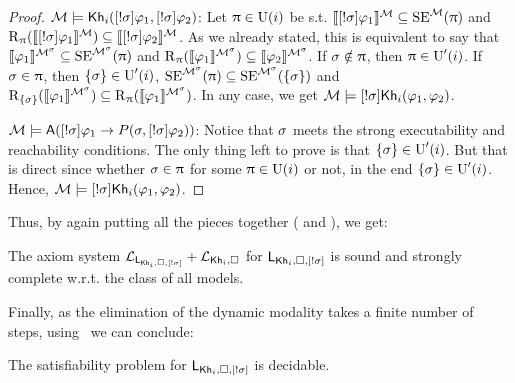 \begin{proof}
  $\modults \models \khi(\srefbox{\plan} \varphi_1,\srefbox{\plan} \varphi_2)$: Let $\plans \in \Unc(i)$ be s.t. $\truthset{\modults}{\srefbox{\plan}\varphi_1} \subseteq \stexec^\modults(\plans)$ and $\R_\plans(\truthset{\modults}{\srefbox{\plan}\varphi_1}) \subseteq \truthset{\modults}{\srefbox{\plan}\varphi_2}$.
As we already stated, this is equivalent to say that $\truthset{\modults^\plan}{\varphi_1} \subseteq \stexec^{\modults^\plan}(\plans)$ and $\R_\plans(\truthset{\modults^\plan}{\varphi_1}) \subseteq \truthset{\modults^\plan}{\varphi_2}$.
If $\plan \notin \plans$, then $\plans \in \Unc'(i)$.
If $\plan \in \plans$, then $\set{\plan} \in \Unc'(i)$, $\stexec^{\modults^\plan}(\plans) \subseteq \stexec^{\modults^\plan}(\set{\plan})$ and $\R_{\set{\plan}}(\truthset{\modults^\plan}{\varphi_1}) \subseteq \R_\plans(\truthset{\modults^\plan}{\varphi_1})$. In any case, we get $\modults \models \srefbox{\plan}\khi(\varphi_1,\varphi_2)$.

$\modults \models \A(\srefbox{\plan} \varphi_1 \ra P(\plan,\srefbox{\plan}\varphi_2))$: Notice that $\plan$ meets the strong executability and reachability conditions.
The only thing left to prove is that $\set{\plan} \in \Unc'(i)$. But that is direct since whether $\plan \in \plans$ for some $\plans \in \Unc(i)$ or not, in the end $\set{\plan} \in \Unc'(i)$. Hence, $\modults \models \srefbox{\plan}\khi(\varphi_1,\varphi_2)$.
\end{proof}

Thus, by again putting all the pieces together ( and ), we get:

\medskip 

\begin{theorem}
The axiom system $\axset_{\PlanReflogic}+\axset_{\khi,\square}$ for $\PlanReflogic$ is sound and strongly complete w.r.t. the class of all models.
\end{theorem}

\medskip 


Finally, as the elimination of the dynamic modality takes a finite number of steps, using~ we can conclude:

\medskip 

\begin{corollary}
The satisfiability problem for $\PlanReflogic$ is decidable.
\end{corollary} 

